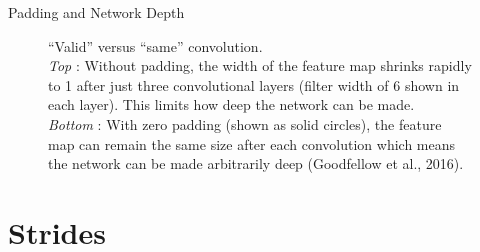 \begin{frame}{Padding and Network Depth}
\begin{figure}
\center
{}
\caption{\small{\enquote{Valid} versus \enquote{same} convolution. 
\\ \emph{Top} : Without padding, the width of the feature map shrinks rapidly to 1 after just three convolutional layers (filter width of 6 shown in each layer). This limits how deep the network can be made. 
\\ \emph{Bottom} : With zero padding (shown as solid circles), the feature map can remain the same size after each convolution which means the network can be made arbitrarily deep (Goodfellow et al., 2016).}}
\end{figure}
\end{frame}
\section{Strides}

